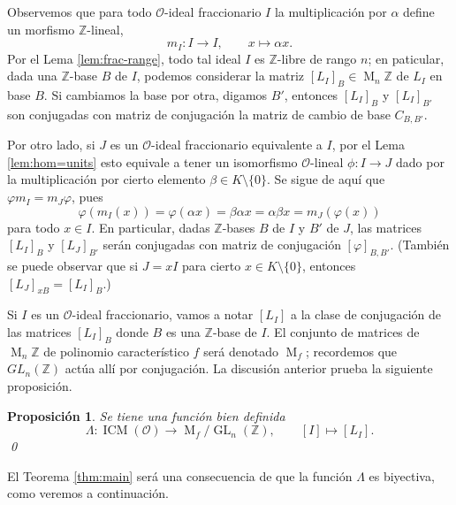 \documentclass[11pt,a4paper]{amsart}
\newcommand{\Z}{\mathbb{Z}}
\DeclareMathOperator{\ICM}{ICM}
\DeclareMathOperator{\M}{M}
\DeclareMathOperator{\GL}{GL}
\numberwithin{equation}{section}
\theoremstyle{plain}
\newtheorem{prop}[equation]{Proposición}
\renewcommand{\O}{\mathcal{O}}
\begin{document}
Observemos que para todo $\O$-ideal fraccionario $I$
la multiplicación por $\alpha$ define un morfismo
$\Z$-lineal,
\[
m_I \colon I \to I, \qquad x \mapsto \alpha x.
\]
Por el Lema \ref{lem:frac-range}, todo tal ideal $I$ es $\Z$-libre
de rango $n$; en paticular, dada una $\Z$-base $B$ de $I$, podemos considerar
la matriz $[L_I]_B \in \M_n \Z$ de $L_I$ en base $B$.
Si cambiamos la base por otra, digamos $B'$, entonces $[L_I]_B$
y $[L_I]_{B'}$ son conjugadas con matriz de conjugación
la matriz de cambio de base $C_{B,B'}$.

Por otro lado, si $J$ es un $\O$-ideal fraccionario equivalente a $I$,
por el Lema \ref{lem:hom=units} esto equivale a tener un
isomorfismo $\O$-lineal $\phi \colon I \to J$
dado por la multiplicación
por cierto elemento $\beta \in K \setminus \{0\}$. Se sigue de aquí que
$\varphi m_I = m_J \varphi$, pues
\[
\varphi(m_I(x)) = \varphi(\alpha x) = \beta \alpha x
= \alpha \beta x = m_J(\varphi(x))
\]
para todo $x \in I$. En particular, dadas $\Z$-bases $B$ de $I$ y $B'$ de $J$,
las matrices $[L_I]_{B}$ y $[L_J]_{B'}$ serán conjugadas con matriz de
conjugación $[\varphi]_{B, B'}$. (También se puede observar que si $J = xI$
para cierto $x \in K \setminus \{0\}$, entonces $[L_J]_{xB} = [L_I]_B$.)

Si $I$ es un $\O$-ideal fraccionario,
vamos a notar $[L_I]$ a la clase de conjugación de las matrices $[L_I]_B$
donde $B$ es una $\Z$-base de $I$. El conjunto de matrices de $\M_n \Z$
de polinomio característico $f$ será denotado $\M_f$; recordemos que
$GL_n(\Z)$ actúa allí por conjugación.
La discusión anterior prueba la siguiente proposición.

\begin{prop} Se tiene una función bien definida
\begin{equation}\label{def:lambda}
\Lambda \colon \ICM(\O) \to \M_f/\GL_n(\Z), \qquad [I] \mapsto [L_I].
\end{equation}
\qed
\end{prop}

El Teorema \ref{thm:main} será una consecuencia de que la función $\Lambda$
es biyectiva, como veremos a continuación.
\end{document}
